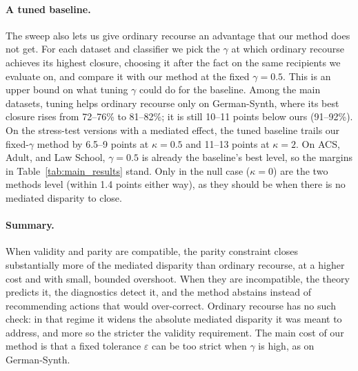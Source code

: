 \paragraph{A tuned baseline.}
The sweep also lets us give ordinary recourse an advantage that our method
does not get. For each dataset and classifier we pick the $\gamma$ at which
ordinary recourse achieves its highest closure, choosing it after the fact on
the same recipients we evaluate on, and compare it with our method at the
fixed $\gamma=0.5$. This is an upper bound on what tuning $\gamma$ could do
for the baseline. Among the main datasets, tuning helps ordinary recourse only
on German-Synth, where
its best closure rises from 72--76\% to 81--82\%; it is still 10--11 points
below ours (91--92\%). On the stress-test versions with a mediated effect, the
tuned baseline trails our fixed-$\gamma$ method by 6.5--9 points at
$\kappa=0.5$ and 11--13 points at $\kappa=2$. On ACS, Adult, and Law School,
$\gamma=0.5$ is already the baseline's best level, so the margins in
Table~\ref{tab:main_results} stand. Only in the null case ($\kappa=0$) are
the two methods level (within 1.4 points either way), as they should be when
there is no mediated disparity to close.

\paragraph{Summary.}
When validity and parity are compatible, the parity constraint closes
substantially more of the mediated disparity than ordinary recourse, at a
higher cost and with small, bounded overshoot. When they are incompatible,
the theory predicts it, the diagnostics detect it, and the method abstains
instead of recommending actions that would over-correct. Ordinary recourse
has no such check: in that regime it widens the absolute mediated disparity it
was meant to address, and more so the stricter the validity requirement. The
main cost of our method is that a fixed tolerance $\varepsilon$ can be too
strict when $\gamma$ is high, as on German-Synth.
